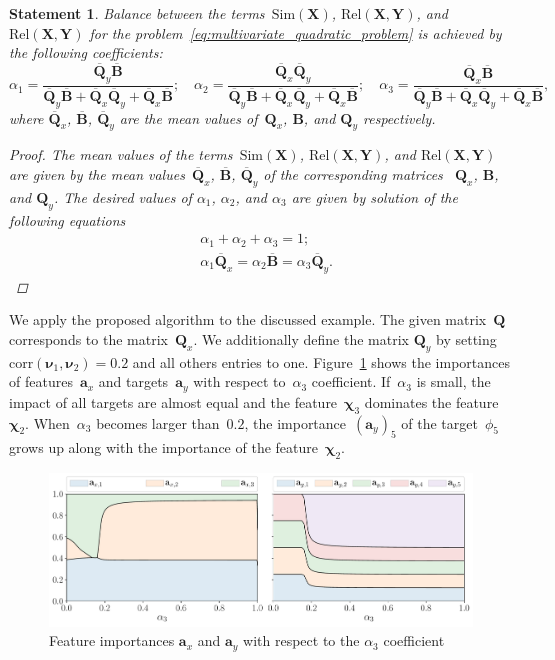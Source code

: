 \documentclass[12pt,twoside]{article}
\newtheorem{statement}{Statement}
\newcommand{\ba}{\mathbf{a}}
\newcommand{\bY}{\mathbf{Y}}
\newcommand{\bX}{\mathbf{X}}
\newcommand{\bB}{\mathbf{B}}
\newcommand{\bQ}{\mathbf{Q}}
\newcommand{\bchi}{\boldsymbol{\chi}}
\newcommand{\bnu}{\boldsymbol{\nu}}
\begin{document}
\begin{statement}
	Balance between the terms~$\text{Sim}(\bX)$, $\text{Rel}(\bX, \bY)$, and $\text{Rel}(\bX, \bY)$ for the problem~\eqref{eq:multivariate_quadratic_problem} is achieved by the following coefficients:
	\[
	\alpha_1 = \frac{\overline{\bQ}_y \overline{\bB} }{\overline{\bQ}_y \overline{\bB} + \overline{\bQ}_x \overline{\bQ}_y + \overline{\bQ}_x \overline{\bB}}; \quad
	\alpha_2 = \frac{\overline{\bQ}_x \overline{\bQ}_y}{\overline{\bQ}_y \overline{\bB} + \overline{\bQ}_x \overline{\bQ}_y + \overline{\bQ}_x \overline{\bB}}; \quad
	\alpha_3  = \frac{\overline{\bQ}_x \overline{\bB}}{\overline{\bQ}_y \overline{\bB} + \overline{\bQ}_x \overline{\bQ}_y + \overline{\bQ}_x \overline{\bB}},
	\]
	where $\overline{\bQ}_x$, $\overline{\bB}$, $\overline{\bQ}_y$ are the mean values of~$\bQ_x$, $\bB$, and $\bQ_y$ respectively.
	\begin{proof}
		The mean values of the terms~$\text{Sim}(\bX)$, $\text{Rel}(\bX, \bY)$, and $\text{Rel}(\bX, \bY)$  are given by the mean values~$\overline{\bQ}_x$, $\overline{\bB}$, $\overline{\bQ}_y$ of the corresponding matrices ~$\bQ_x$, $\bB$, and $\bQ_y$.
		The desired values of $\alpha_1$, $\alpha_2$, and $\alpha_3$ are given by solution of the following equations
		\begin{align*}
			&\alpha_1 + \alpha_2 + \alpha_3 = 1; \\
			&\alpha_1 \overline{\bQ}_x = \alpha_2 \overline{\bB} = \alpha_3 \overline{\bQ}_y.
		\end{align*}
	\end{proof}
\end{statement}

We apply the proposed algorithm to the discussed example.
The given matrix~$\bQ$ corresponds to the matrix~$\bQ_x$. 
We additionally define the matrix $\bQ_y$ by setting $\text{corr}(\bnu_1, \bnu_2) = 0.2$ and all others entries to one. 
Figure~\ref{fig:features_vs_alpha} shows the importances of features~$\ba_x$ and targets~$\ba_y$ with respect to~$\alpha_3$ coefficient. 
If~$\alpha_3$ is small, the impact of all targets are almost equal and the feature~$\bchi_3$ dominates the feature~$\bchi_2$. When~$\alpha_3$ becomes larger than~$0.2$, the importance~$(\ba_y)_5$ of the target~$\phi_5$ grows up along with the importance of the feature~$\bchi_2$. 

\begin{figure}
	\centering
	\includegraphics[width=\linewidth]{figs/features_vs_alpha.pdf}
	\caption{Feature importances $\ba_x$ and $\ba_y$ with respect to the $\alpha_3$ coefficient}
	\label{fig:features_vs_alpha}
\end{figure}
\end{document}
